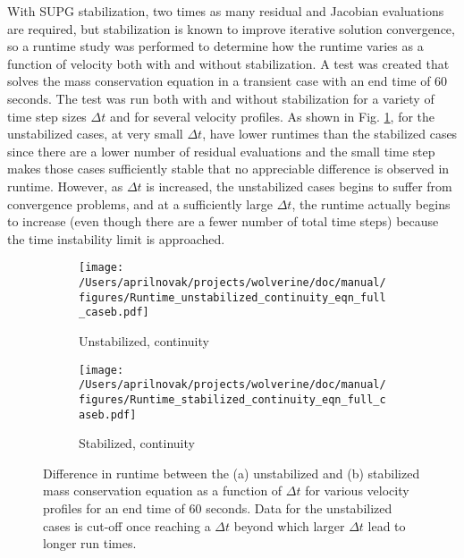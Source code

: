 \documentclass[10pt]{article}
\numberwithin{equation}{section} %
\begin{document}
With SUPG stabilization, two times as many residual and Jacobian evaluations are required, but stabilization is known to improve iterative solution convergence, so a runtime study was performed to determine how the runtime varies as a function of velocity both with and without stabilization. A test was created that solves the mass conservation equation in a transient case with an end time of 60 seconds. The test was run both with and without stabilization for a variety of time step sizes \(\Delta t\) and for several velocity profiles. As shown in Fig. \ref{fig:runtime1}, for the unstabilized cases, at very small \(\Delta t\), have lower runtimes than the stabilized cases since there are a lower number of residual evaluations and the small time step makes those cases sufficiently stable that no appreciable difference is observed in runtime. However, as \(\Delta t\) is increased, the unstabilized cases begins to suffer from convergence problems, and at a sufficiently large \(\Delta t\), the runtime actually begins to increase (even though there are a fewer number of total time steps) because the time instability limit is approached. 

\begin{figure}[H]
\centering
\begin{subfigure}{0.45\textwidth}
  \centering
  \texttt{[image: /Users/aprilnovak/projects/wolverine/doc/manual/figures/Runtime\_unstabilized\_continuity\_eqn\_full\_caseb.pdf]}
  \caption{Unstabilized, continuity}
\end{subfigure}
\begin{subfigure}{0.45\textwidth}
  \centering
  \texttt{[image: /Users/aprilnovak/projects/wolverine/doc/manual/figures/Runtime\_stabilized\_continuity\_eqn\_full\_caseb.pdf]}
  \caption{Stabilized, continuity}
\end{subfigure}
\caption{Difference in runtime between the (a) unstabilized and (b) stabilized mass conservation equation as a function of \(\Delta t\) for various velocity profiles for an end time of 60 seconds. Data for the unstabilized cases is cut-off once reaching a \(\Delta t\) beyond which larger \(\Delta t\) lead to longer run times.}
\label{fig:runtime1}
\end{figure}
\end{document}
